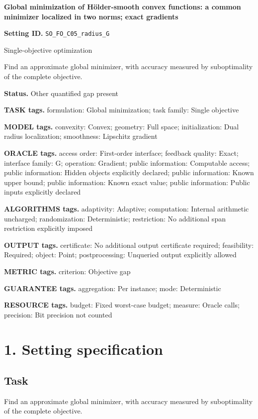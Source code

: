 \documentclass[10pt,a4paper]{article}
\begin{document}
\raggedright

{\LARGE\bfseries\sffamily\color{AtlasNavy} Global minimization of Hölder-smooth convex functions: a common minimizer localized in two norms; exact gradients\par}\vspace{5pt}
\textbf{Setting ID.} \texttt{SO\_\allowbreak{}FO\_\allowbreak{}C05\_\allowbreak{}radius\_\allowbreak{}G}

Single-objective optimization

Find an approximate global minimizer, with accuracy measured by suboptimality of the complete objective.

\textbf{Status.} Other quantified gap present

\textbf{TASK tags.} formulation: Global minimization; task family: Single objective

\textbf{MODEL tags.} convexity: Convex; geometry: Full space; initialization: Dual radius localization; smoothness: Lipschitz gradient

\textbf{ORACLE tags.} access order: First-order interface; feedback quality: Exact; interface family: G; operation: Gradient; public information: Computable access; public information: Hidden objects explicitly declared; public information: Known upper bound; public information: Known exact value; public information: Public inputs explicitly declared

\textbf{ALGORITHMS tags.} adaptivity: Adaptive; computation: Internal arithmetic uncharged; randomization: Deterministic; restriction: No additional span restriction explicitly imposed

\textbf{OUTPUT tags.} certificate: No additional output certificate required; feasibility: Required; object: Point; postprocessing: Unqueried output explicitly allowed

\textbf{METRIC tags.} criterion: Objective gap

\textbf{GUARANTEE tags.} aggregation: Per instance; mode: Deterministic

\textbf{RESOURCE tags.} budget: Fixed worst-case budget; measure: Oracle calls; precision: Bit precision not counted

\section{1. Setting specification}
\subsection{Task}
Find an approximate global minimizer, with accuracy measured by suboptimality of the complete objective.
\end{document}
